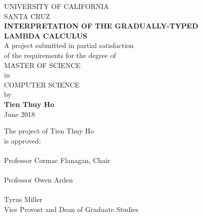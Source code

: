 \thispagestyle{empty}
\afterpage{\blankpage}

\pagebreak
\begin{center}
  UNIVERSITY OF CALIFORNIA \\
  SANTA CRUZ \\
  \bigskip
  \textbf{INTERPRETATION OF THE GRADUALLY-TYPED} \\
  \textbf{LAMBDA CALCULUS} \\ 
  \bigskip
  A project submitted in partial satisfaction \\ 
  of the requirements for the degree of \\ 
  \bigskip
  MASTER OF SCIENCE \\ 
  \bigskip
  in \\
  \bigskip
  COMPUTER SCIENCE \\
  \bigskip 
  by \\ 
  \bigskip
  \textbf{Tien Thuy Ho} \\
  \bigskip
  June 2018
  \bigskip
  \bigskip
\end{center}
\begin{flushleft}
  \hspace{7cm}The project of Tien Thuy Ho \\
  \hspace{7cm}is approved: \\
  \bigskip
  \bigskip
  \hspace{7cm} \hrulefill \\
  \hspace{7cm} Professor Cormac Flanagan, Chair \\ 
  \bigskip
  \bigskip
  \hspace{7cm} \hrulefill \\
  \hspace{7cm} Professor Owen Arden \\
  \bigskip
  \bigskip 
  \underline{\hspace{6cm}} \\ 
  Tyrus Miller \\
  Vice Provost and Dean of Graduate Studies
\end{flushleft}
\pagebreak